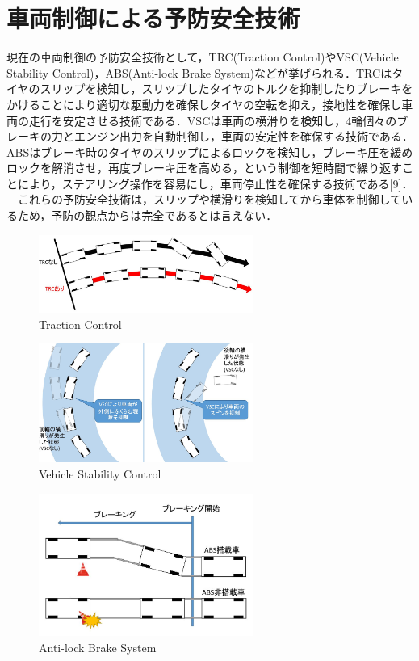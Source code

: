 \documentclass[twocolumn]{jsarticle}
\begin{document}
\section{車両制御による予防安全技術}
現在の車両制御の予防安全技術として，TRC(Traction Control)やVSC(Vehicle Stability Control)，ABS(Anti-lock Brake System)などが挙げられる．TRCはタイヤのスリップを検知し，スリップしたタイヤのトルクを抑制したりブレーキをかけることにより適切な駆動力を確保しタイヤの空転を抑え，接地性を確保し車両の走行を安定させる技術である．VSCは車両の横滑りを検知し，4輪個々のブレーキの力とエンジン出力を自動制御し，車両の安定性を確保する技術である．
ABSはブレーキ時のタイヤのスリップによるロックを検知し，ブレーキ圧を緩めロックを解消させ，再度ブレーキ圧を高める，という制御を短時間で繰り返すことにより，ステアリング操作を容易にし，車両停止性を確保する技術である[9]．
\\　これらの予防安全技術は，スリップや横滑りを検知してから車体を制御しているため，予防の観点からは完全であるとは言えない．
\begin{figure}[H]
	\centering
	\includegraphics[width=7cm]{trc.jpg}
	\caption{Traction Control}
	\label{fig01}
\end{figure}
\begin{figure}[H]
	\centering
	\includegraphics[width=7cm]{vsc.jpg}
	\caption{Vehicle Stability Control}
	\label{fig02}
\end{figure}
\begin{figure}[H]
	\centering
	\includegraphics[width=7cm]{abs.jpg}
	\caption{Anti-lock Brake System}
	\label{fig03}
\end{figure}
\end{document}
